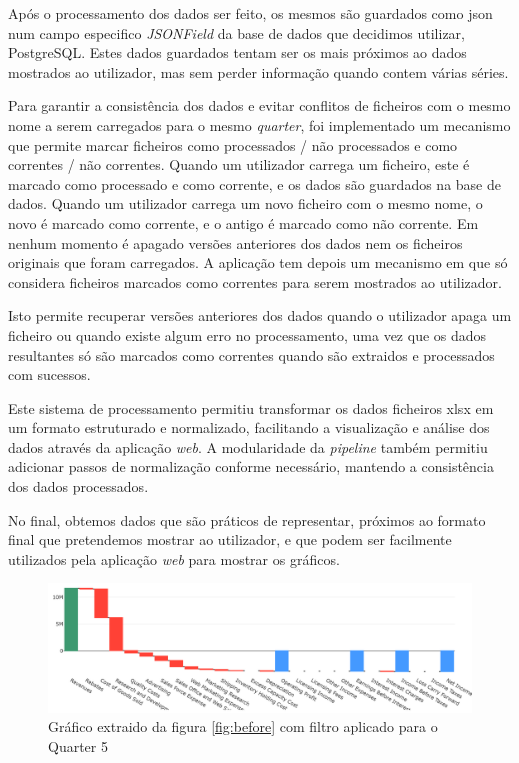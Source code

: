 Após o processamento dos dados ser feito, os mesmos são guardados como \gls{json} num campo especifico \textit{JSONField} da base de dados que decidimos utilizar, PostgreSQL. Estes dados guardados tentam ser os mais próximos ao dados mostrados ao utilizador, mas sem perder informação quando contem várias séries.

Para garantir a consistência dos dados e evitar conflitos de ficheiros com o mesmo nome a serem carregados para o mesmo \textit{quarter}, foi implementado um mecanismo que permite marcar ficheiros como processados / não processados e como correntes / não correntes. Quando um utilizador carrega um ficheiro, este é marcado como processado e como corrente, e os dados são guardados na base de dados. Quando um utilizador carrega um novo ficheiro com o mesmo nome, o novo é marcado como corrente, e o antigo é marcado como não corrente. Em nenhum momento é apagado versões anteriores dos dados nem os ficheiros originais que foram carregados. A aplicação tem depois um mecanismo em que só considera ficheiros marcados como correntes para serem mostrados ao utilizador.

Isto permite recuperar versões anteriores dos dados quando o utilizador apaga um ficheiro ou quando existe algum erro no processamento, uma vez que os dados resultantes só são marcados como correntes quando são extraidos e processados com sucessos.

Este sistema de processamento permitiu transformar os dados ficheiros \gls{xlsx} em um formato estruturado e normalizado, facilitando a visualização e análise dos dados através da aplicação \textit{web}. A modularidade da \textit{pipeline} também permitiu adicionar passos de normalização conforme necessário, mantendo a consistência dos dados processados.

No final, obtemos dados que são práticos de representar, próximos ao formato final que pretendemos mostrar ao utilizador, e que podem ser facilmente utilizados pela aplicação \textit{web} para mostrar os gráficos.

\begin{figure}[H]
\centering
\includegraphics[max width=\textwidth]{./img/after}
\caption{Gráfico extraido da figura \ref{fig:before} com filtro aplicado para o Quarter 5}
\label{fig:after}
\end{figure}

